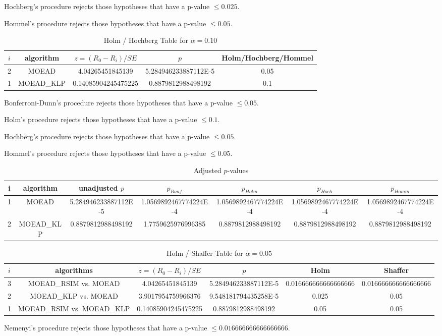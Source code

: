\documentclass[a4paper,10pt]{article}
\begin{document}
\begin{landscape}
Hochberg's procedure rejects those hypotheses that have a p-value $\le0.025$.


Hommel's procedure rejects those hypotheses that have a p-value $\le0.05$.


\begin{table}[!htp]
\centering\tiny
\caption{Holm / Hochberg Table for $\alpha=0.10$}
\begin{tabular}{ccccc}
$i$&algorithm&$z=(R_0 - R_i)/SE$&$p$&Holm/Hochberg/Hommel\\
\hline
2&MOEAD&4.04265451845139&5.284946233887112E-5&0.05\\
1&MOEAD_KLP&0.14085904245475225&0.8879812988498192&0.1\\
\hline
\end{tabular}
\end{table}
Bonferroni-Dunn's procedure rejects those hypotheses that have a p-value $\le0.05$.


Holm's procedure rejects those hypotheses that have a p-value $\le0.1$.


Hochberg's procedure rejects those hypotheses that have a p-value $\le0.05$.


Hommel's procedure rejects those hypotheses that have a p-value $\le0.05$.


\begin{table}[!htp]
\centering\tiny
\caption{Adjusted $p$-values}
\begin{tabular}{ccccccc}
i&algorithm&unadjusted $p$&$p_{Bonf}$&$p_{Holm}$&$p_{Hoch}$&$p_{Homm}$\\
\hline
1&MOEAD&5.284946233887112E-5&1.0569892467774224E-4&1.0569892467774224E-4&1.0569892467774224E-4&1.0569892467774224E-4\\
2&MOEAD_KLP&0.8879812988498192&1.7759625976996385&0.8879812988498192&0.8879812988498192&0.8879812988498192\\
\hline
\end{tabular}
\end{table}

\begin{table}[!htp]
\centering\tiny
\caption{Holm / Shaffer Table for $\alpha=0.05$}
\begin{tabular}{cccccc}
$i$&algorithms&$z=(R_0 - R_i)/SE$&$p$&Holm&Shaffer\\
\hline
3&MOEAD_RSIM vs. MOEAD&4.04265451845139&5.284946233887112E-5&0.016666666666666666&0.016666666666666666\\
2&MOEAD_KLP vs. MOEAD&3.9017954759966376&9.548181794435258E-5&0.025&0.05\\
1&MOEAD_RSIM vs. MOEAD_KLP&0.14085904245475225&0.8879812988498192&0.05&0.05\\
\hline
\end{tabular}
\end{table}
Nemenyi's procedure rejects those hypotheses that have a p-value $\le0.016666666666666666$.



\end{landscape}
\end{document}

